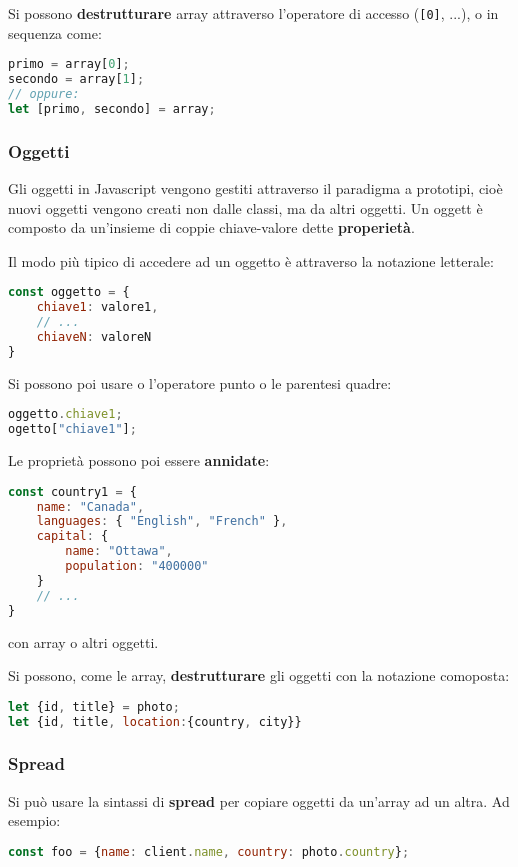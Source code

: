 \documentclass[a4paper,11pt]{article}
\begin{document}
Si possono \textbf{destrutturare} array attraverso l'operatore di accesso (\lstinline|[0]|, ...), o in sequenza come:
\begin{lstlisting}[language=javascript, style=codestyle]	
primo = array[0];
secondo = array[1];
// oppure:
let [primo, secondo] = array;
\end{lstlisting}

\subsubsection{Oggetti}
Gli oggetti in Javascript vengono gestiti attraverso il paradigma a prototipi, cioè nuovi oggetti vengono creati non dalle classi, ma da altri oggetti.
Un oggett è composto da un'insieme di coppie chiave-valore dette \textbf{properietà}.

Il modo più tipico di accedere ad un oggetto è attraverso la notazione letterale:
\begin{lstlisting}[language=javascript, style=codestyle]	
const oggetto = {
	chiave1: valore1,
	// ...
	chiaveN: valoreN
}
\end{lstlisting}

Si possono poi usare o l'operatore punto o le parentesi quadre:
\begin{lstlisting}[language=javascript, style=codestyle]	
oggetto.chiave1;
ogetto["chiave1"];
\end{lstlisting}

Le proprietà possono poi essere \textbf{annidate}:
\begin{lstlisting}[language=javascript, style=codestyle]	
const country1 = {
	name: "Canada",
	languages: { "English", "French" },
	capital: {
		name: "Ottawa",
		population: "400000"
	}
	// ...
}
\end{lstlisting}
con array o altri oggetti.

Si possono, come le array, \textbf{destrutturare} gli oggetti con la notazione comoposta:
\begin{lstlisting}[language=javascript, style=codestyle]	
let {id, title} = photo;
let {id, title, location:{country, city}}
\end{lstlisting}

\subsubsection{Spread}
Si può usare la sintassi di \textbf{spread} per copiare oggetti da un'array ad un altra. Ad esempio:
\begin{lstlisting}[language=javascript, style=codestyle]	
const foo = {name: client.name, country: photo.country};
\end{lstlisting}
\end{document}
